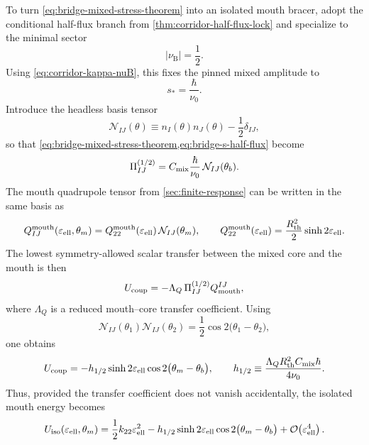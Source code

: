 \documentclass[11pt]{article}
\theoremstyle{plain}
\theoremstyle{definition}
\theoremstyle{remark}
\newcommand{\Rth}{R_{\mathrm{th}}}
\newcommand{\nuB}{\nu_{\mathrm{B}}}
\newcommand{\epsell}{\varepsilon_{\mathrm{ell}}}
\newcommand{\thmouth}{\theta_m}
\newcommand{\Order}[1]{\mathcal{O}\!\left(#1\right)}
\begin{document}
To turn \cref{eq:bridge-mixed-stress-theorem} into an isolated mouth bracer, adopt the conditional half-flux branch from \cref{thm:corridor-half-flux-lock} and specialize to the minimal sector
\begin{equation}
|\nuB|=\frac12.
\label{eq:bridge-minimal-half-flux}
\end{equation}
Using \cref{eq:corridor-kappa-nuB}, this fixes the pinned mixed amplitude to
\begin{equation}
s_* = \frac{\hbar}{\nu_0}.
\label{eq:bridge-s-half-flux}
\end{equation}
Introduce the headless basis tensor
\begin{equation}
\mathcal N_{IJ}(\theta)
\equiv
n_I(\theta)n_J(\theta)-\frac12\delta_{IJ},
\label{eq:bridge-N-basis}
\end{equation}
so that \cref{eq:bridge-mixed-stress-theorem,eq:bridge-s-half-flux} become
\begin{equation}
\Pi^{(1/2)}_{IJ}
=
C_{\rm mix}\frac{\hbar}{\nu_0}\,\mathcal N_{IJ}(\theta_b).
\label{eq:bridge-half-flux-stress}
\end{equation}
The mouth quadrupole tensor from \cref{sec:finite-response} can be written in the same basis as
\begin{equation}
Q_{IJ}^{\rm mouth}(\epsell,\thmouth)
=
Q_{22}^{\rm mouth}(\epsell)\,\mathcal N_{IJ}(\thmouth),
\qquad
Q_{22}^{\rm mouth}(\epsell)=\frac{\Rth^2}{2}\sinh 2\epsell.
\label{eq:bridge-mouth-tensor}
\end{equation}
The lowest symmetry-allowed scalar transfer between the mixed core and the mouth is then
\begin{equation}
U_{\rm coup}
=
-\Lambda_Q\,\Pi^{(1/2)}_{IJ}Q_{\rm mouth}^{IJ},
\label{eq:bridge-Ucoup-def}
\end{equation}
where \(\Lambda_Q\) is a reduced mouth--core transfer coefficient. Using
\begin{equation}
\mathcal N_{IJ}(\theta_1)\mathcal N_{IJ}(\theta_2)
=
\frac12\cos 2\bigl(\theta_1-\theta_2\bigr),
\label{eq:bridge-N-contraction}
\end{equation}
one obtains
\begin{equation}
U_{\rm coup}
=
-h_{1/2}\sinh 2\epsell\cos 2\bigl(\thmouth-\theta_b\bigr),
\qquad
h_{1/2}
\equiv
\frac{\Lambda_Q\Rth^2 C_{\rm mix}\hbar}{4\nu_0}.
\label{eq:bridge-h-half}
\end{equation}
Thus, provided the transfer coefficient does not vanish accidentally, the isolated mouth energy becomes
\begin{equation}
U_{\rm iso}(\epsell,\thmouth)
=
\frac12 k_{22}\epsell^2
-h_{1/2}\sinh 2\epsell\cos 2\bigl(\thmouth-\theta_b\bigr)
+\Order{\epsell^4}.
\label{eq:bridge-isolated-mouth-energy}
\end{equation}
\end{document}
